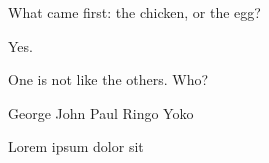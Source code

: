 \documentclass[english]{hogent-exam}
\begin{document}
\maketitle





\begin{questions}

\framedsolutions
\ifsolution
  \printanswers
\else
  \noprintanswers
  \newpage
\fi


\question[10] What came first: the chicken, or the egg?

\begin{solutionordottedlines}[2cm]
  Yes.
\end{solutionordottedlines}

\question[1] One is not like the others. Who?

\begin{oneparcheckboxes}
  \choice George
  \choice John
  \choice Paul
  \choice Ringo
  \CorrectChoice Yoko
\end{oneparcheckboxes}

\question[1] Lorem ipsum dolor sit \fillin[amet][5cm]

\end{questions}

\ScratchNotes
\end{document}
